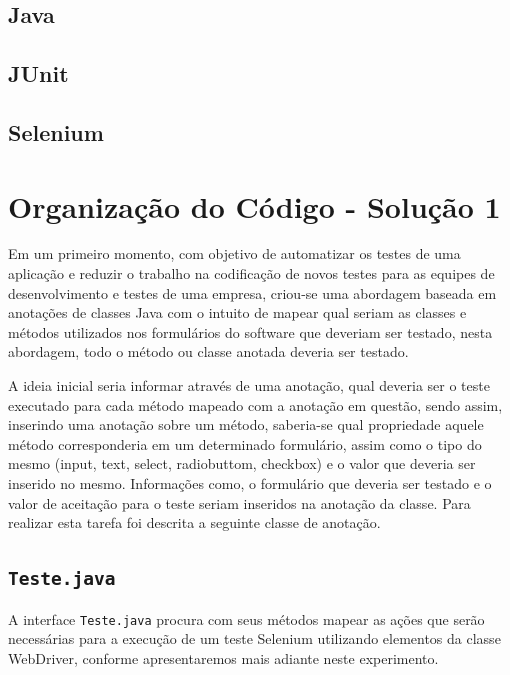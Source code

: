 \documentclass[tg]{mdtufsm}
\begin{document}
\subsection{Java}
\subsection{JUnit}
\subsection{Selenium}

\section{Organização do Código - Solução 1}

Em um primeiro momento, com objetivo de automatizar os testes de uma aplicação e reduzir o trabalho na codificação de novos testes para as equipes de desenvolvimento e testes de uma empresa, criou-se uma abordagem baseada em anotações de classes Java com o intuito de mapear qual seriam as classes e métodos utilizados nos formulários do software que deveriam ser testado, nesta abordagem, todo o método ou classe anotada deveria ser testado. 

A ideia inicial seria informar através de uma anotação, qual deveria ser o teste executado para cada método mapeado com a anotação em questão, sendo assim, inserindo uma anotação sobre um método, saberia-se qual propriedade aquele método corresponderia em um determinado formulário, assim como o tipo do mesmo (input, text, select, radiobuttom, checkbox) e o valor que deveria ser inserido no mesmo. Informações como, o formulário que deveria ser testado e o valor de aceitação para o teste seriam inseridos na anotação da classe. Para realizar esta tarefa foi descrita a seguinte classe de anotação.


\subsection{\texttt{Teste.java}}

A interface \texttt{Teste.java} procura com seus métodos mapear as ações que serão necessárias para a execução de um teste Selenium utilizando elementos da classe WebDriver, conforme apresentaremos mais adiante neste experimento.
\end{document}
